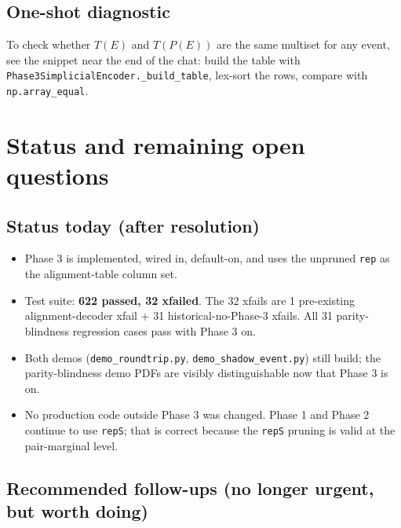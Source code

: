 \documentclass[a4paper,11pt]{article}
\begin{document}
\subsection{One-shot diagnostic}
To check whether $T(E)$ and $T(P(E))$ are the same multiset for any
event, see the snippet near the end of the chat: build the table with
\texttt{Phase3SimplicialEncoder.\_build\_table}, lex-sort the rows,
compare with \texttt{np.array\_equal}.

\section{Status and remaining open questions}

\subsection{Status today (after resolution)}
\begin{itemize}[nosep]
  \item Phase 3 is implemented, wired in, default-on, and uses the
        unpruned \texttt{rep} as the alignment-table column set.
  \item Test suite: \textbf{622 passed, 32 xfailed}.  The 32 xfails are
        1 pre-existing alignment-decoder xfail + 31
        historical-no-Phase-3 xfails.  All 31 parity-blindness
        regression cases pass with Phase 3 on.
  \item Both demos (\texttt{demo\_roundtrip.py},
        \texttt{demo\_shadow\_event.py}) still build; the
        parity-blindness demo PDFs are visibly distinguishable now
        that Phase 3 is on.
  \item No production code outside Phase 3 was changed.  Phase 1 and
        Phase 2 continue to use \texttt{repS}; that is correct because
        the \texttt{repS} pruning is valid at the pair-marginal level.
\end{itemize}

\subsection{Recommended follow-ups (no longer urgent, but worth doing)}
\end{document}
